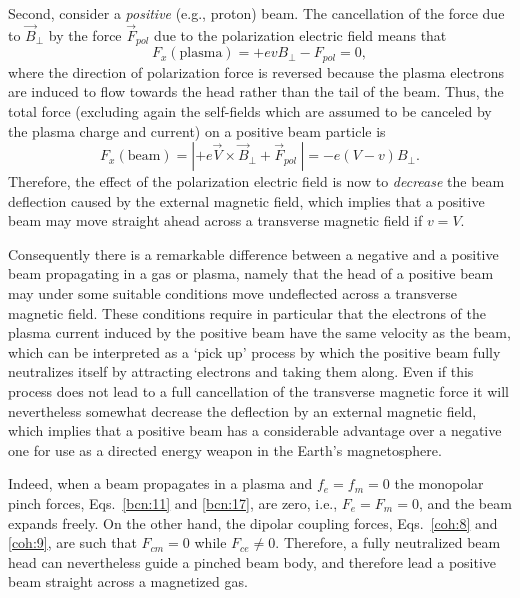 \documentclass [12pt,a4paper,     ]{report} %
\begin{document}
   Second, consider a \emph{positive} (e.g., proton) beam.  The  cancellation of the force due to $\vec{B}_{\perp}$ by the force $\vec{F}_{pol}$ due to the polarization electric field means that
%
\begin{equation}\label{mag:8} %
          F_x(\text{plasma}) = +e v  B_{\perp} -  F_{pol} = 0,
\end{equation}
%
where the direction of polarization force is reversed because the plasma electrons are induced to flow towards the head rather than the tail of the beam. Thus, the total force (excluding again the self-fields which are assumed to be canceled by the plasma charge and current) on a positive beam particle is
%
\begin{equation}\label{mag:9} %
       F_x(\text{beam}) = |+e \vec{V} \times \vec{B}_{\perp} +  \vec{F}_{pol} ~ |
                 = -  e (V - v) B_{\perp}.
\end{equation}
%
Therefore, the effect of the polarization electric field is now to \emph{decrease} the beam deflection caused by the external magnetic field, which implies that a positive beam may move straight ahead across a transverse magnetic field if $v=V$.

   Consequently there is a remarkable difference between a negative and a positive beam propagating in a gas or plasma, namely that the head of a positive beam may under some suitable conditions move undeflected across a transverse magnetic field. These conditions require in particular that the electrons of the plasma current induced by the positive beam have the same velocity as the beam, which can be interpreted as a `pick up' process by which the positive beam fully neutralizes itself by attracting electrons and taking them along.  Even if this process does not lead to a full cancellation of the transverse magnetic force it will nevertheless somewhat decrease the deflection by an external magnetic field, which implies that a positive beam has a considerable advantage over a negative one for use as a directed energy weapon in the Earth's magnetosphere.

   Indeed, when a beam propagates in a plasma and $f_e=f_m=0$ the monopolar pinch forces, Eqs.~\eqref{bcn:11} and \eqref{bcn:17}, are zero, i.e., $F_e=F_m=0$, and the beam expands freely.  On the other hand, the dipolar coupling forces, Eqs.~\eqref{coh:8} and \eqref{coh:9}, are such that $F_{cm}=0$ while $F_{ce} \neq 0$.  Therefore, a fully neutralized beam head can nevertheless guide a pinched beam body, and therefore lead a positive beam straight across a magnetized gas.
\end{document}

